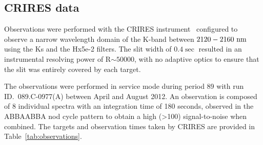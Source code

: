\subsection{CRIRES data}
\label{subsec:CRIRES}
Observations were performed with the CRIRES instrument~\citep{kaeufl_crires_2004} configured to observe a narrow wavelength domain of the K-band between \(\rm2120-2160~nm \) using the Ks and the Hx5e-2 filters. The slit width of \(0.4\sec \) resulted in an instrumental resolving power of R\(\sim50000 \), with no adaptive optics to ensure that the slit was entirely covered by each target.

The observations were performed in service mode during period 89 with run ID.~089.C-0977(A) between April and August 2012. An observation is composed of 8 individual spectra with an integration time of 180 seconds, observed in the ABBAABBA nod cycle pattern to obtain a high (>100) signal-to-noise when combined. The targets and observation times taken by CRIRES are provided in Table~\ref{tab:observations}.

